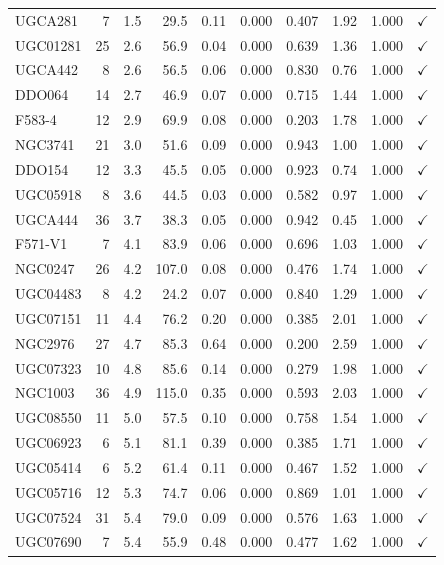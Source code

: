 \begin{longtable}{lrrrrrrrrr}
UGCA281 & 7 & 1.5 & 29.5 & 0.11 & 0.000 & 0.407 & 1.92 & 1.000 & $\checkmark$ \\
UGC01281 & 25 & 2.6 & 56.9 & 0.04 & 0.000 & 0.639 & 1.36 & 1.000 & $\checkmark$ \\
UGCA442 & 8 & 2.6 & 56.5 & 0.06 & 0.000 & 0.830 & 0.76 & 1.000 & $\checkmark$ \\
DDO064 & 14 & 2.7 & 46.9 & 0.07 & 0.000 & 0.715 & 1.44 & 1.000 & $\checkmark$ \\
F583-4 & 12 & 2.9 & 69.9 & 0.08 & 0.000 & 0.203 & 1.78 & 1.000 & $\checkmark$ \\
NGC3741 & 21 & 3.0 & 51.6 & 0.09 & 0.000 & 0.943 & 1.00 & 1.000 & $\checkmark$ \\
DDO154 & 12 & 3.3 & 45.5 & 0.05 & 0.000 & 0.923 & 0.74 & 1.000 & $\checkmark$ \\
UGC05918 & 8 & 3.6 & 44.5 & 0.03 & 0.000 & 0.582 & 0.97 & 1.000 & $\checkmark$ \\
UGCA444 & 36 & 3.7 & 38.3 & 0.05 & 0.000 & 0.942 & 0.45 & 1.000 & $\checkmark$ \\
F571-V1 & 7 & 4.1 & 83.9 & 0.06 & 0.000 & 0.696 & 1.03 & 1.000 & $\checkmark$ \\
NGC0247 & 26 & 4.2 & 107.0 & 0.08 & 0.000 & 0.476 & 1.74 & 1.000 & $\checkmark$ \\
UGC04483 & 8 & 4.2 & 24.2 & 0.07 & 0.000 & 0.840 & 1.29 & 1.000 & $\checkmark$ \\
UGC07151 & 11 & 4.4 & 76.2 & 0.20 & 0.000 & 0.385 & 2.01 & 1.000 & $\checkmark$ \\
NGC2976 & 27 & 4.7 & 85.3 & 0.64 & 0.000 & 0.200 & 2.59 & 1.000 & $\checkmark$ \\
UGC07323 & 10 & 4.8 & 85.6 & 0.14 & 0.000 & 0.279 & 1.98 & 1.000 & $\checkmark$ \\
NGC1003 & 36 & 4.9 & 115.0 & 0.35 & 0.000 & 0.593 & 2.03 & 1.000 & $\checkmark$ \\
UGC08550 & 11 & 5.0 & 57.5 & 0.10 & 0.000 & 0.758 & 1.54 & 1.000 & $\checkmark$ \\
UGC06923 & 6 & 5.1 & 81.1 & 0.39 & 0.000 & 0.385 & 1.71 & 1.000 & $\checkmark$ \\
UGC05414 & 6 & 5.2 & 61.4 & 0.11 & 0.000 & 0.467 & 1.52 & 1.000 & $\checkmark$ \\
UGC05716 & 12 & 5.3 & 74.7 & 0.06 & 0.000 & 0.869 & 1.01 & 1.000 & $\checkmark$ \\
UGC07524 & 31 & 5.4 & 79.0 & 0.09 & 0.000 & 0.576 & 1.63 & 1.000 & $\checkmark$ \\
UGC07690 & 7 & 5.4 & 55.9 & 0.48 & 0.000 & 0.477 & 1.62 & 1.000 & $\checkmark$ \\

\end{longtable}

